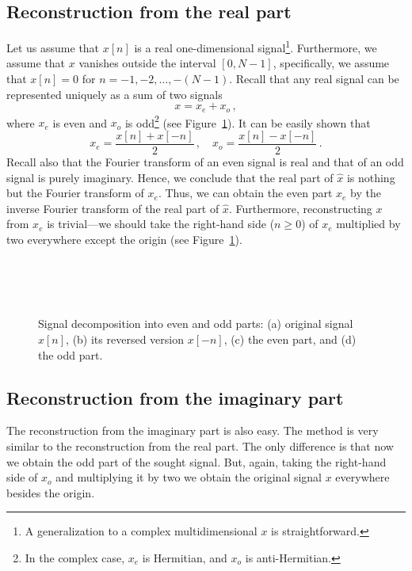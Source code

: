 \subsection{Reconstruction from the real part}
\label{sec:reconstr-from-real}
Let us assume that $x[n]$ is a real one-dimensional signal\footnote{A
  generalization to a complex multidimensional  $x$ is
  straightforward.}. Furthermore, we assume that $x$ vanishes outside
the interval $[0,N-1]$, specifically, we assume that
$x[n]=0$ for $n = -1, -2, \ldots, -(N-1)$. Recall that any real signal
can be represented uniquely as a sum of two signals
\begin{equation}
  \label{eq:intro-5}
  x = x_{e}+x_{o} \,, 
\end{equation}
where $x_{e}$ is even and $x_{o}$ is odd\footnote{In the complex case,
  $x_{e}$ is Hermitian, and $x_{o}$ is anti-Hermitian.}
(see Figure~\ref{fig:even-odd}).  It can be easily
shown that
\begin{equation}
  \label{eq:intro-6}
  x_{e} = \frac{x[n] + x[-n]}{2}\,, \quad x_{o}=\frac{x[n] - x[-n]}{2}
  \,. 
\end{equation}
Recall also that the Fourier transform of an even signal is real and
that of an odd signal is purely imaginary. Hence, we conclude that the
real part of $\hat{x}$ is nothing but the Fourier transform of
$x_{e}$. Thus, we can obtain the even part $x_{e}$ by the inverse
Fourier transform of the real part of $\hat{x}$.  Furthermore,
reconstructing $x$ from $x_{e}$ is trivial---we should take the right-hand
side ($n\geq0$) of $x_{e}$ multiplied by two everywhere except the
origin (see Figure~\ref{fig:even-odd}).

\begin{figure}[H]
  \centering
  \\
  \\
  \\
  \caption[Signal decomposition into even and odd parts]{Signal decomposition into even and odd parts: (a) original
    signal $x[n]$, (b) its reversed version $x[-n]$, (c) the even
    part, and (d) the odd part.}
  \label{fig:even-odd}
\end{figure}

\subsection{Reconstruction from the imaginary part}
\label{sec:reconstr-from-imag}
The reconstruction from the imaginary part is also easy. The method is
very similar to the reconstruction from the real part. The only
difference is that now we obtain the odd part of the sought
signal. But, again, taking the right-hand side of $x_{o}$ and multiplying
it by two we obtain the original signal $x$ everywhere besides the
origin.

